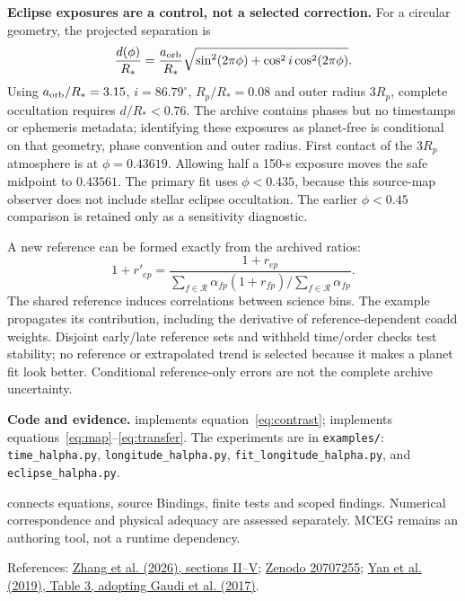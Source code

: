 \documentclass[10pt,a4paper]{article}
\begin{document}
\textbf{Eclipse exposures are a control, not a selected correction.}
For a circular geometry, the projected separation is
\begin{equation}
\frac{d(\phi)}{R_*}=\frac{a_{\rm orb}}{R_*}
\sqrt{\sin^2(2\pi\phi)+\cos^2 i\cos^2(2\pi\phi)}.
\end{equation}
Using $a_{\rm orb}/R_*=3.15$, $i=86.79^\circ$, $R_p/R_*=0.08$ and
outer radius $3R_p$, complete occultation requires $d/R_*<0.76$.
The archive contains phases but no timestamps or ephemeris metadata;
identifying these exposures as planet-free is conditional on that geometry,
phase convention and outer radius. First contact of the $3R_p$ atmosphere
is at $\phi=0.43619$. Allowing half a 150-s exposure moves the safe midpoint
to $0.43561$. The primary fit uses $\phi<0.435$, because this source-map
observer does not include stellar eclipse occultation. The earlier
$\phi<0.45$ comparison is retained only as a sensitivity diagnostic.

A new reference can be formed exactly from the archived ratios:
\begin{equation}
1+r'_{ep}=\frac{1+r_{ep}}
 {\sum_{f\in\mathcal R}\alpha_{fp}(1+r_{fp})/\sum_{f\in\mathcal R}\alpha_{fp}}.
\end{equation}
The shared reference induces correlations between science bins. The example
propagates its contribution, including the derivative of reference-dependent
coadd weights. Disjoint early/late reference sets and withheld time/order
checks test stability; no reference or extrapolated trend is selected because
it makes a planet fit look better. Conditional reference-only errors are not
the complete archive uncertainty.

\textbf{Code and evidence.}
 implements equation~\eqref{eq:contrast};
 implements equations~\eqref{eq:map}--\eqref{eq:transfer}.
The experiments are in \texttt{examples/}: \texttt{time\_halpha.py},
\texttt{longitude\_halpha.py}, \texttt{fit\_longitude\_halpha.py}, and
\texttt{eclipse\_halpha.py}.


 connects equations, source
Bindings, finite tests and scoped findings. Numerical correspondence and
physical adequacy are assessed separately. MCEG remains an authoring tool,
not a runtime dependency.

\small References:
\href{https://arxiv.org/html/2606.23899v1}{Zhang et al. (2026), sections II--V};
\href{https://doi.org/10.5281/zenodo.20707255}{Zenodo 20707255};
\href{https://www.aanda.org/articles/aa/pdf/2019/12/aa36396-19.pdf}
{Yan et al. (2019), Table 3, adopting Gaudi et al. (2017)}.
\end{document}
